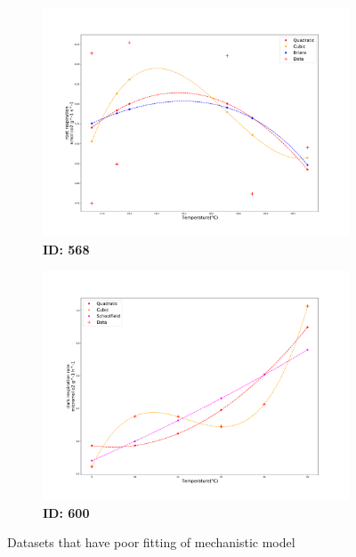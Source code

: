 \documentclass[11pt]{article}
\begin{document}
\begin{figure}
    \begin{subfigure}[t]{.5\textwidth}
      \center
      \includegraphics[width=\linewidth]{../Results/Results_backup/images/TPC_fitting568.pdf}
      \caption{\textbf{ID: 568}}
    \end{subfigure}
    \hfill
    \begin{subfigure}[t]{.5\textwidth}
    \center
      \includegraphics[width=\linewidth]{../Results/Results_backup/images/TPC_fitting600.pdf}
      \caption{\textbf{ID: 600}}
    \end{subfigure}
    \caption{Datasets that have poor fitting of mechanistic model}
  \end{figure}
\end{document}
